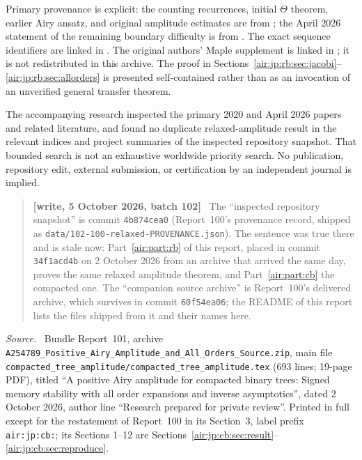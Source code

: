 \documentclass[11pt,letterpaper]{article}
\numberwithin{equation}{section}
\theoremstyle{remark}
\newenvironment{partsource}{\par\medskip\noindent\begin{minipage}{\linewidth}\small\raggedright\textit{Source.}\ }{\end{minipage}\par\medskip}
\newenvironment{writenotejp}{\par\smallskip\begin{quote}\small\textbf{[write, 5 October 2026, batch 102]}\ }{\end{quote}\smallskip}
\newcommand{\repopath}[1]{\nolinkurl{#1}}
\begin{document}
Primary provenance is explicit: the counting recurrences, initial $\Theta$ theorem, earlier Airy ansatz, and original amplitude estimates are from \cite{epfw}; the April 2026 statement of the remaining boundary difficulty is from \cite{epflw}. The exact sequence identifiers are linked in \cite{oeis}. The original authors' Maple supplement is linked in \cite{maple}; it is not redistributed in this archive. The proof in Sections~\ref{air:jp:rb:sec:jacobi}--\ref{air:jp:rb:sec:allorders} is presented self-contained rather than as an invocation of an unverified general transfer theorem.

The accompanying research inspected the primary 2020 and April 2026 papers and related literature, and found no duplicate relaxed-amplitude result in the relevant indices and project summaries of the inspected repository snapshot. That bounded search is not an exhaustive worldwide priority search. No publication, repository edit, external submission, or certification by an independent journal is implied.
\begin{writenotejp}
The ``inspected repository snapshot'' is commit \texttt{4b874cea0} (Report~100's provenance record, shipped as \repopath{data/102-100-relaxed-PROVENANCE.json}). The sentence was true there and is stale now: Part~\ref{air:part:rb} of this report, placed in commit \texttt{34f1acd4b} on 2 October 2026 from an archive that arrived the same day, proves the same relaxed amplitude theorem, and Part~\ref{air:part:cb} the compacted one. The ``companion source archive'' is Report~100's delivered archive, which survives in commit \texttt{60f54ea06}; the README of this report lists the files shipped from it and their names here.
\end{writenotejp}

\bigskip{}\par\nopagebreak
\begin{partsource}
Bundle Report~101, archive \repopath{A254789_Positive_Airy_Amplitude_and_All_Orders_Source.zip}, main file \repopath{compacted_tree_amplitude/compacted_tree_amplitude.tex} (693 lines; 19-page PDF), titled ``A positive Airy amplitude for compacted binary trees: Signed memory stability with all order expansions and inverse asymptotics'', dated 2 October 2026, author line ``Research prepared for private review''. Printed in full except for the restatement of Report~100 in its Section~3, label prefix \texttt{air:jp:cb:}; its Sections 1--12 are Sections~\ref{air:jp:cb:sec:result}--\ref{air:jp:cb:sec:reproduce}.
\end{partsource}
\end{document}
